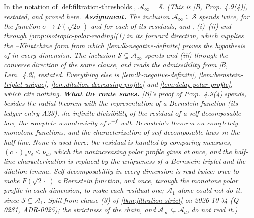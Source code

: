 \begin{lemma}
\label{lem:filtration-top}
\leanok
In the notation of \ref{def:filtration-thresholds}, $\mathcal{A}_\infty = \mathcal{S}$.
\statusA\quad{}\quad{}\quad{}\quad{}\quad\emph{(This is
[B, Prop.~4.9(4)], restated, and proved here. \textbf{Assignment.} The inclusion
$\mathcal{A}_\infty \subseteq \mathcal{S}$ spends  twice, for the function
$\sigma \mapsto F(\sqrt{2\sigma})$ and for each of its residuals, and , (i)--(ii)
and  through \ref{prop:isotropic-polar-reading}(1) in its forward direction, which
supplies the \Levy--Khintchine form from which \ref{lem:lk-negative-definite} proves the hypothesis
of  in every dimension. The inclusion $\mathcal{S} \subseteq \mathcal{A}_\infty$ spends
 and (iii) through the converse direction of the same clause, and reads the
admissibility from [B, Lem.~4.2], restated. Everything else is \ref{lem:lk-negative-definite},
\ref{lem:bernstein-triplet-unique}, \ref{lem:dilation-decreasing-profile} and
\ref{lem:delay-polar-profile}, which cite nothing. \textbf{What the route saves.} [B]'s proof
of Prop.~4.9(4) spends, besides the radial theorem with the representation of a Bernstein function
(its ledger entry A23), the infinite divisibility of the residual of a self-decomposable law, the
complete monotonicity of $e^{-f}$ with Bernstein's theorem on completely monotone functions, and the
characterization of self-decomposable laws on the half-line. None is used here: the residual is
handled by comparing \Levy{} measures, $(c\,\cdot)_*\nu_d \le \nu_d$, which the nonincreasing polar
profile gives at once, and the half-line characterization is replaced by the uniqueness of a
Bernstein triplet and the dilation lemma. Self-decomposability in every dimension is read twice:
once to make $F(\sqrt{2\,\cdot})$ a Bernstein function, and once, through the monotone polar profile
in each dimension, to make each residual one; $\mathcal{A}_1$ alone could not do it, since
$\mathcal{S} \subsetneq \mathcal{A}_1$. Split from clause (3) of \ref{thm:filtration-strict} on
2026-10-04 (Q-0281, ADR-0025); the strictness of the chain, and $\mathcal{A}_\infty \subsetneq
\mathcal{A}_d$, do not read it.)}
\end{lemma}

